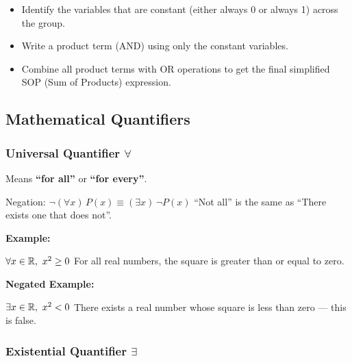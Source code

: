 \begin{enumerate}
		  \begin{itemize}

			\item Identify the variables that are constant (either always 0 or always 1) across the group.

			\item Write a product term (AND) using only the constant variables.

			\item Combine all product terms with OR operations to get the final simplified SOP (Sum of 
				  Products) expression.

		\end{itemize}

	\end{enumerate}

\subsection{Mathematical Quantifiers}

\subsubsection{Universal Quantifier \texorpdfstring{\(\forall\)}{}}  

Means \textbf{``for all''} or \textbf{``for every''}.
\vspace{\baselineskip}
		
{Negation:} \(\neg (\forall x)\,P(x) \equiv (\exists x)\, \neg P(x)\) ``Not all'' is the same as 
``There exists one that does not''.
\vspace{\baselineskip}

\textbf{Example:} 
\vspace{\baselineskip}

\(\forall x \in \mathbb{R},\ x^2 \geq 0\) For all real numbers, the square is greater than or equal to zero.
\vspace{\baselineskip}
	
\textbf{Negated Example:} 
\vspace{\baselineskip}

\(\exists x \in \mathbb{R},\ x^2 < 0\) There exists a real number whose square is less than zero — this is 
false.
		

\subsubsection{Existential Quantifier \texorpdfstring{\(\exists\)}{}}  
	
